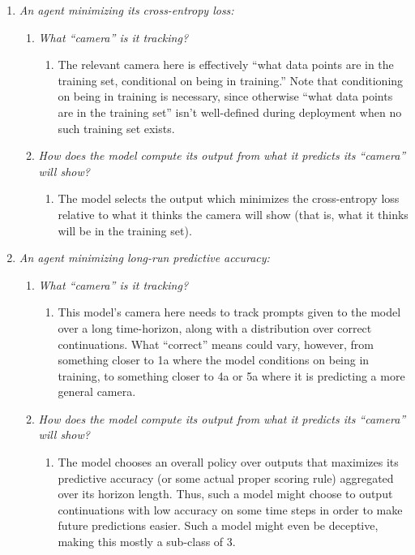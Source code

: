\documentclass[
  onecolumn,
  nonatbib,
]{miri-tech-article}
\begin{document}
\begin{enumerate}
\item \textit{An agent minimizing its cross-entropy loss:}
    \begin{enumerate}
    \item \textit{What ``camera'' is it tracking?}
        \begin{enumerate}
        \item The relevant camera here is effectively ``what data points are in the training set, conditional on being in training.'' Note that conditioning on being in training is necessary, since otherwise ``what data points are in the training set'' isn't well-defined during deployment when no such training set exists.
        \end{enumerate}
    \item \textit{How does the model compute its output from what it predicts its ``camera'' will show?}
        \begin{enumerate}
        \item The model selects the output which minimizes the cross-entropy loss relative to what it thinks the camera will show (that is, what it thinks will be in the training set).
        \end{enumerate}
    \end{enumerate}
\item \textit{An agent minimizing long-run predictive accuracy:}
    \begin{enumerate}
    \item \textit{What ``camera'' is it tracking?}
        \begin{enumerate}
        \item This model's camera here needs to track prompts given to the model over a long time-horizon, along with a distribution over correct continuations. What “correct” means could vary, however, from something closer to 1a where the model conditions on being in training, to something closer to 4a or 5a where it is predicting a more general camera.
        \end{enumerate}
    \item \textit{How does the model compute its output from what it predicts its ``camera'' will show?}
        \begin{enumerate}
        \item The model chooses an overall policy over outputs that maximizes its predictive accuracy (or some actual proper scoring rule) aggregated over its horizon length. Thus, such a model might choose to output continuations with low accuracy on some time steps in order to make future predictions easier. Such a model might even be deceptive, making this mostly a sub-class of 3.

\end{enumerate}
\end{enumerate}
\end{enumerate}
\end{document}
